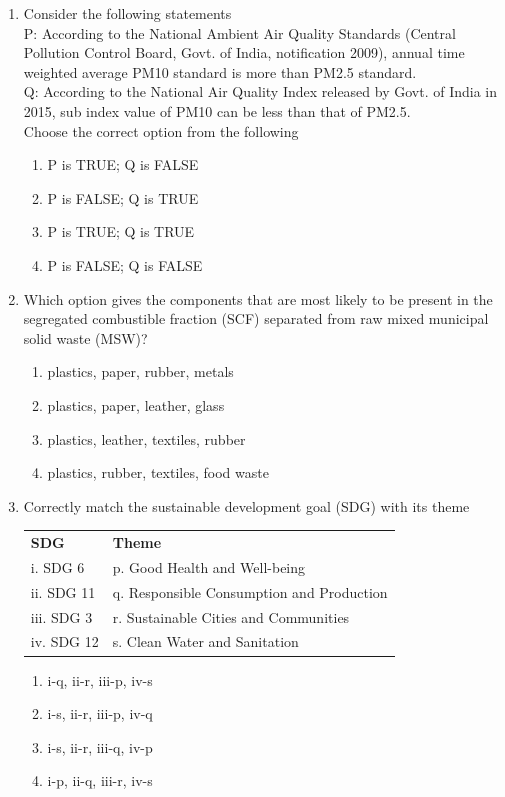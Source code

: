 \documentclass[journal]{IEEEtran}
\begin{document}
\begin{enumerate}[resume]
\item Consider the following statements \\
P: According to the National Ambient Air Quality Standards (Central Pollution Control Board, Govt. of India, notification 2009), annual time weighted average PM10 standard is more than PM2.5 standard. \\
Q: According to the National Air Quality Index released by Govt. of India in 2015, sub index value of PM10 can be less than that of PM2.5. \\
Choose the correct option from the following
\hfill{}
\begin{enumerate}
\item P is TRUE; Q is FALSE
\item P is FALSE; Q is TRUE
\item P is TRUE; Q is TRUE
\item P is FALSE; Q is FALSE
\end{enumerate}

\item Which option gives the components that are most likely to be present in the segregated combustible fraction (SCF) separated from raw mixed municipal solid waste (MSW)?
\hfill{}
\begin{enumerate}
\item plastics, paper, rubber, metals
\item plastics, paper, leather, glass
\item plastics, leather, textiles, rubber
\item plastics, rubber, textiles, food waste
\end{enumerate}

\item Correctly match the sustainable development goal (SDG) with its theme
\hfill{}
\begin{table}[H]
\centering
\begin{tabular}{ll}
\textbf{SDG} & \textbf{Theme} \\
i. SDG 6 & p. Good Health and Well-being \\
ii. SDG 11 & q. Responsible Consumption and Production \\
iii. SDG 3 & r. Sustainable Cities and Communities \\
iv. SDG 12 & s. Clean Water and Sanitation
\end{tabular}
\end{table}
\begin{enumerate}
\item i-q, ii-r, iii-p, iv-s
\item i-s, ii-r, iii-p, iv-q
\item i-s, ii-r, iii-q, iv-p
\item i-p, ii-q, iii-r, iv-s
\end{enumerate}


\end{enumerate}
\end{document}

